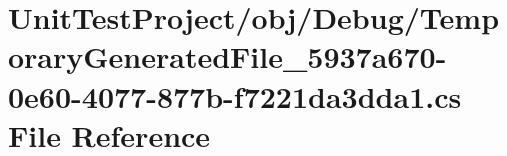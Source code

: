 \hypertarget{_unit_test_project_2obj_2_debug_2_temporary_generated_file__5937a670-0e60-4077-877b-f7221da3dda1_8cs}{}\section{Unit\+Test\+Project/obj/\+Debug/\+Temporary\+Generated\+File\+\_\+5937a670-\/0e60-\/4077-\/877b-\/f7221da3dda1.cs File Reference}
\label{_unit_test_project_2obj_2_debug_2_temporary_generated_file__5937a670-0e60-4077-877b-f7221da3dda1_8cs}
